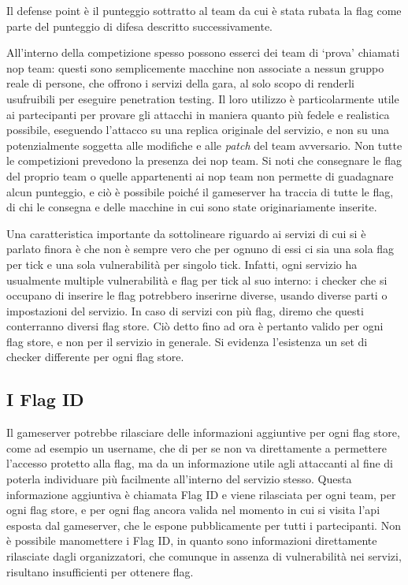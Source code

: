 Il defense point è il punteggio sottratto al team da cui è stata rubata la flag come parte del punteggio di difesa descritto successivamente.

All'interno della competizione spesso possono esserci dei team di `prova' chiamati \gls{nop} team: questi sono semplicemente macchine non associate a nessun gruppo reale di persone, che offrono i servizi della gara, al solo scopo di renderli usufruibili per eseguire penetration testing. Il loro utilizzo è particolarmente utile ai partecipanti per provare gli attacchi in maniera quanto più fedele e realistica possibile, eseguendo l'attacco su una replica originale del servizio, e non su una potenzialmente soggetta alle modifiche e alle \textit{patch} del team avversario. Non tutte le competizioni prevedono la presenza dei \gls{nop} team.
Si noti che consegnare le flag del proprio team o quelle appartenenti ai \gls{nop} team non permette di guadagnare alcun punteggio, e ciò è possibile poiché il gameserver ha traccia di tutte le flag, di chi le consegna e delle macchine in cui sono state originariamente inserite.

Una caratteristica importante da sottolineare riguardo ai servizi di cui si è parlato finora è che non è sempre vero che per ognuno di essi ci sia una sola flag per tick e una sola vulnerabilità per singolo tick. Infatti, ogni servizio ha usualmente multiple vulnerabilità e flag per tick al suo interno: i checker che si occupano di inserire le flag potrebbero inserirne diverse, usando diverse parti o impostazioni del servizio.
In caso di servizi con più flag, diremo che questi conterranno diversi flag store. Ciò detto fino ad ora è pertanto valido per ogni flag store, e non per il servizio in generale. Si evidenza l'esistenza un set di checker differente per ogni flag store.

\subsection{I Flag ID}

Il gameserver potrebbe rilasciare delle informazioni aggiuntive per ogni flag store, come ad esempio un username, che di per se non va direttamente a permettere l'accesso protetto alla flag, ma da un informazione utile agli attaccanti al fine di poterla individuare più facilmente all'interno del servizio stesso.
Questa informazione aggiuntiva è chiamata Flag ID e viene rilasciata per ogni team, per ogni flag store, e per ogni flag ancora valida nel momento in cui si visita l'\gls{api} esposta dal gameserver, che le espone pubblicamente per tutti i partecipanti. Non è possibile manomettere i Flag ID, in quanto sono informazioni direttamente rilasciate dagli organizzatori, che comunque in assenza di vulnerabilità nei servizi, risultano insufficienti per ottenere flag.

